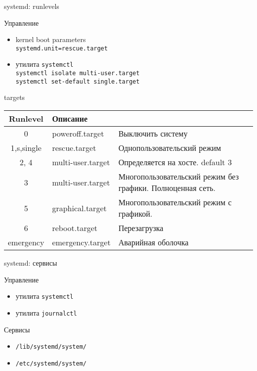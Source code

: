 \begin{frame}{systemd: runlevels}
	\begin{block}{Управление}
		\begin{itemize}
			\item kernel boot parameters\\
				{\tt systemd.unit=rescue.target} \\
			\item утилита {\tt systemctl} \\
				{\tt systemctl isolate multi-user.target} \\
				{\tt systemctl set-default single.target}
		\end{itemize}
	\end{block}

	\begin{block}{targets}
		\tiny
		\begin{table}
			\begin{tabular}{| c | l | l | }
			\hline
			Runlevel & Описание\\
			\hline
			0	& poweroff.target & Выключить систему \\
			1,s,single & rescue.target  & Однопользовательский режим \\
			2, 4	& multi-user.target & Определяется на хосте. default 3\\
			3	& multi-user.target & Многопользовательский режим без графики. Полноценная сеть. \\
			5	& graphical.target & Многопользовательский режим с графикой.\\
			6	& reboot.target & Перезагрузка\\
			emergency & emergency.target & Аварийная оболочка \\
			\hline
			\end{tabular}
		\end{table}
	\end{block}
\end{frame}

\begin{frame}{systemd: сервисы}
	\begin{block}{Управление}
		\begin{itemize}
			\item утилита {\tt systemctl}
			\item утилита {\tt journalctl}
		\end{itemize}
	\end{block}

	\begin{block}{Сервисы}
		\begin{itemize}
			\item {\tt /lib/systemd/system/}
			\item {\tt /etc/systemd/system/}
		\end{itemize}
	\end{block}
\end{frame}
